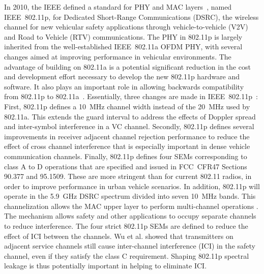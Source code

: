 In 2010, the IEEE defined a standard for PHY and MAC layers~\cite{802-11p2010}, named IEEE~802.11p, for Dedicated Short-Range Communications (DSRC), the wireless channel for new vehicular safety applications through vehicle-to-vehicle (V2V) and Road to Vehicle (RTV) communications.
The PHY in 802.11p is largely inherited from the well-established IEEE~802.11a OFDM PHY, with several changes aimed at improving performance in vehicular environments.
The advantage of building on 802.11a is a potential significant reduction in the cost and development effort necessary to develop the new 802.11p hardware and software.
It also plays an important role in allowing backwards compatibility from 802.11p to 802.11a~\cite{Vandenberghe2011,Fernandez2012}.
Essentially, three changes are made in IEEE~802.11p~\cite{Jiang2008}:
First, 802.11p defines a 10~MHz channel width instead of the 20~MHz used by 802.11a.
This extends the guard interval to address the effects of Doppler spread and inter-symbol interference in a VC channel.
Secondly, 802.11p defines several improvements in receiver adjacent channel rejection performance to reduce the effect of cross channel interference that is especially important in dense vehicle communication channels.
Finally, 802.11p defines four SEMs corresponding to class A to D operations that are specified and issued in FCC~CFR47 Sections 90.377 and 95.1509.
These are more stringent than for current 802.11 radios, in order to improve performance in urban vehicle scenarios.
In addition, 802.11p will operate in the 5.9~GHz DSRC spectrum divided into seven 10~MHz bands. 
This channelization allows the MAC upper layer to perform multi-channel operations \cite{WAVE2010}.
The mechanism allows safety and other applications to occupy separate channels to reduce interference.
The four strict 802.11p SEMs are defined to reduce the effect of ICI between the channels. %
Wu et al. \cite{Wu2013} showed that transmitters on adjacent service channels still cause inter-channel interference (ICI) in the safety channel, even if they satisfy the class C requirement.
Shaping 802.11p  spectral leakage is thus potentially important in helping to eliminate ICI.

